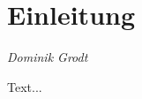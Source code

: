 \chapter*{Einleitung}
\thispagestyle{empty}

\begin{center}
\emph{{\small Dominik Grodt}}
\end{center}

\bigskip

Text...
